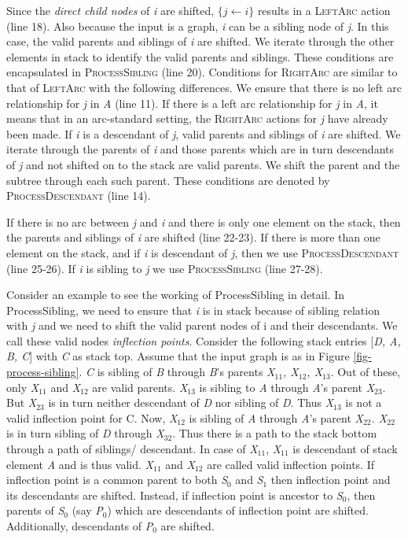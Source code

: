 \documentclass[11pt]{article}
\begin{document}
Since the {\it direct child nodes} of {\it i} are shifted, $\{j \leftarrow i\}$ results in a \textsc{LeftArc} action (line 18). Also because the input is a graph, {\it i} can be a sibling node of {\it j}. In this case, the valid parents and siblings of {\it i} are shifted. We iterate through the other elements in stack to identify the valid parents and siblings. These conditions are encapsulated in \textsc{ProcessSibling} (line 20). Conditions for \textsc{RightArc} are similar to that of \textsc{LeftArc} with the following differences. We ensure that there is no left arc relationship for {\it j} in {\it A} (line 11). If there is a left arc relationship for {\it j} in {\it A}, it means that in an arc-standard setting, the \textsc{RightArc} actions for {\it j} have already been made. If {\it i} is a descendant of {\it j}, valid parents and siblings of {\it i} are shifted. We iterate through the parents of {\it i} and those parents which are in turn descendants of {\it j} and not shifted on to the stack are valid parents. We shift the parent and the subtree through each such parent. These conditions are denoted by \textsc{ProcessDescendant} (line 14). 

If there is no arc between {\it j} and {\it i} and there is only one element on the stack, then the parents and siblings of {\it i} are shifted (line 22-23). If there is more than one element on the stack, and if {\it i} is descendant of {\it j}, then we use \textsc{ProcessDescendant} (line 25-26). If {\it i} is sibling to {\it j} we use \textsc{ProcessSibling} (line 27-28). 



Consider an example to see the working of {\sc ProcessSibling} in detail. In {\sc ProcessSibling}, we need to ensure that {\it i} is in stack because of sibling relation with {\it j} and we need to shift the valid parent nodes of i and their descendants. We call these valid nodes {\it inflection points}. Consider the following stack entries [{\it D, A, B, C}] with {\it C} as stack top. Assume that the input graph is as in Figure \ref{fig-process-sibling}. {\it C} is sibling of {\it B} through {\it B}'s parents {\it X$_{11}$, X$_{12}$, X$_{13}$}. Out of these, only {\it X$_{11}$} and {\it X$_{12}$} are valid parents.  {\it X$_{13}$} is sibling to {\it A} through {\it A}'s parent {\it X$_{23}$}. But {\it X$_{23}$} is in turn neither descendant of {\it D} nor sibling of {\it D}. Thus {\it X$_{13}$} is not a valid inflection point for {C}. Now, {\it X$_{12}$} is sibling of {\it A} through {\it A}'s parent {\it X$_{22}$. X$_{22}$} is in turn sibling of {\it D} through {\it X$_{32}$}. Thus there is a path to the stack bottom through a path of siblings/ descendant. In case of {\it X$_{11}$}, {\it X$_{11}$} is descendant of stack element {\it A} and is thus valid. {\it X$_{11}$} and {\it X$_{12}$} are called valid inflection points. If inflection point is a common parent to both {\it S$_0$} and {\it S$_1$} then inflection point and its descendants are shifted. Instead, if inflection point is ancestor to {\it S$_0$}, then parents of {\it S$_0$} (say {\it P$_0$}) which are descendants of inflection point are shifted. Additionally, descendants of {\it P$_0$} are shifted. 
\end{document}
